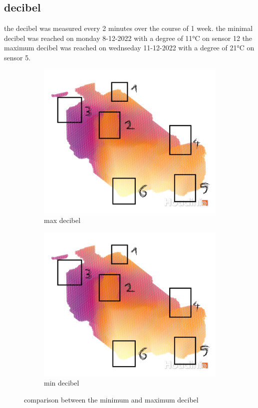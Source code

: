 \subsection{decibel} 
the decibel was measured every 2 minutes over the course of 1 week. the minimal decibel was reached on monday 8-12-2022 with a degree of 11°C on sensor 12 the maximum decibel was reached on wednseday 11-12-2022 with a degree of 21°C on sensor 5.\\ 
\begin{figure}[hbt!] 
\begin{subfigure}{0.5\textwidth} 
\includegraphics[width=0.99\linewidth]{reports/current_report/images/max_decibel.png}  
\caption{max decibel}  
\end{subfigure} 
\begin{subfigure}{0.5\textwidth} 
\includegraphics[width=0.99\linewidth]{reports/current_report/images/min_decibel.png}  
\caption{min decibel}  
\end{subfigure} 
\caption{comparison between the minimum and maximum  decibel}  
\end{figure} 
